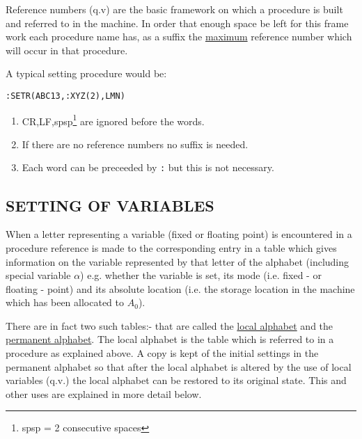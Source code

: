 \documentclass[10pt, a4paper, oneside]{article}
\newcommand{\myuline}[1]{\uline{#1}}
\newcommand{\mytt}[1]{\texttt{\scriptsize #1}}
\newcommand{\mytt}[1]{\texttt{\small #1}}
\begin{document}
\begin{multicols}{2}
Reference numbers (q.v) are the basic framework on
which a procedure is built and referred to in
the machine.  In order that enough space be left for
this frame work each procedure name has, as a suffix
the \myuline{maximum} reference number which will occur in that
procedure.

A typical setting procedure would be:

\begin{addmargin}[1cm]{1em}%
\begin{lstlisting}
:SETR(ABC13,:XYZ(2),LMN)
\end{lstlisting}
\end{addmargin}


\renewcommand{\labelenumi}{\ifnum\value{enumi}=1 \myuline{Notes} (\roman{enumi})\else (\roman{enumi})\fi}
\begin{enumerate}

\item CR,LF,spsp\footnote{spsp = 2 consecutive spaces} are ignored before the words.

\item If there are no reference numbers no
suffix is needed.

\item Each word can be preceeded by \mytt{:} but this
is not necessary.

\end{enumerate}

\subsection{SETTING OF VARIABLES}

When a letter representing a variable (fixed or
floating point) is encountered in a procedure
reference is made to the corresponding entry in a
table which gives information on the variable
represented by that letter of the alphabet
(including special variable $\alpha$) e.g. whether the
variable is set, its mode (i.e. fixed - or floating
- point) and its absolute location (i.e. the storage
location in the machine which has been allocated to
$A_{0}$).

There are in fact two such tables:- that are
called the \myuline{local alphabet} and the \myuline{permanent alphabet}.
The local alphabet is the table which is referred to
in a procedure as explained above.  A copy is kept
of the initial settings in the permanent alphabet so
that after the local alphabet is altered by the use
of local variables (q.v.) the local alphabet can be
restored to its original state.  This and other uses
are explained in more detail below.



\end{multicols}
\end{document}
